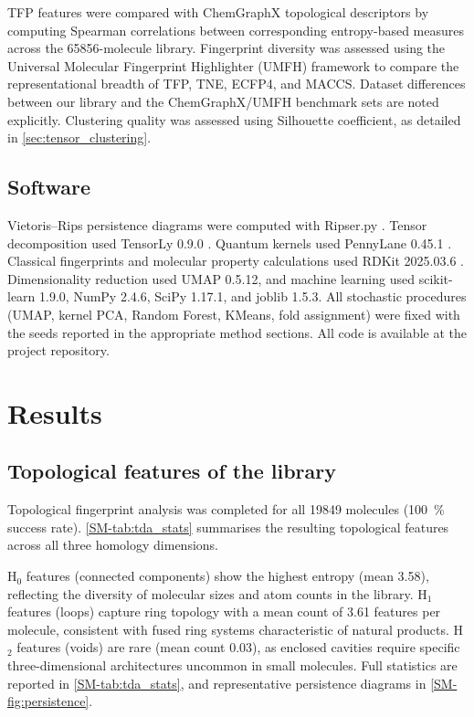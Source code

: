 \documentclass[11pt,a4paper]{article}
\begin{document}
TFP features were compared with ChemGraphX topological descriptors \citep{chemgraphx_2026} by computing Spearman correlations between corresponding entropy-based measures across the \num{65856}-molecule library. Fingerprint diversity was assessed using the Universal Molecular Fingerprint Highlighter (UMFH) framework \citep{umfh_2026} to compare the representational breadth of TFP, TNE, ECFP4, and MACCS. Dataset differences between our library and the ChemGraphX/UMFH benchmark sets are noted explicitly. Clustering quality was assessed using Silhouette coefficient, as detailed in \cref{sec:tensor_clustering}.

\subsection{Software}

Vietoris--Rips persistence diagrams were computed with Ripser.py \citep{ripser_2019}. Tensor decomposition used TensorLy 0.9.0 \citep{tensorly_2019}. Quantum kernels used PennyLane 0.45.1 \citep{pennylane_2024}. Classical fingerprints and molecular property calculations used RDKit 2025.03.6 \citep{rdkit_2024}. Dimensionality reduction used UMAP 0.5.12, and machine learning used scikit-learn 1.9.0, NumPy 2.4.6, SciPy 1.17.1, and joblib 1.5.3. All stochastic procedures (UMAP, kernel PCA, Random Forest, KMeans, fold assignment) were fixed with the seeds reported in the appropriate method sections. All code is available at the project repository.


\section{Results}

\subsection{Topological features of the library}

Topological fingerprint analysis was completed for all \num{19849} molecules (\qty{100}{\percent} success rate). \cref{SM-tab:tda_stats} summarises the resulting topological features across all three homology dimensions.

H$_0$ features (connected components) show the highest entropy (mean \num{3.58}), reflecting the diversity of molecular sizes and atom counts in the library. H$_1$ features (loops) capture ring topology with a mean count of \num{3.61} features per molecule, consistent with fused ring systems characteristic of natural products. H$_2$ features (voids) are rare (mean count \num{0.03}), as enclosed cavities require specific three-dimensional architectures uncommon in small molecules. Full statistics are reported in \cref{SM-tab:tda_stats}, and representative persistence diagrams in \cref{SM-fig:persistence}.
\end{document}
